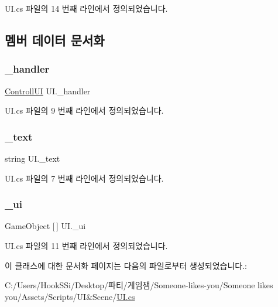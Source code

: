 U\+I.\+cs 파일의 14 번째 라인에서 정의되었습니다.


\begin{DoxyCode}{0}

\end{DoxyCode}


\subsection{멤버 데이터 문서화}
\mbox{\label{class_u_i_abd8fa36b26bb2f28b91ef983d965fa36}} 
\subsubsection{\texorpdfstring{\_handler}{\_handler}}
{\footnotesize\ttfamily \mbox{\hyperlink{class_u_i_aaf972ce6483c1efd427a579a33b42552}{Controll\+UI}} U\+I.\+\_\+handler}



U\+I.\+cs 파일의 9 번째 라인에서 정의되었습니다.

\mbox{\label{class_u_i_affa689bbe19b28237e02c9fcaac85585}} 
\subsubsection{\texorpdfstring{\_text}{\_text}}
{\footnotesize\ttfamily string U\+I.\+\_\+text}



U\+I.\+cs 파일의 7 번째 라인에서 정의되었습니다.

\mbox{\label{class_u_i_a96cc096c816feecc70b636fa26161d09}} 
\subsubsection{\texorpdfstring{\_ui}{\_ui}}
{\footnotesize\ttfamily Game\+Object \mbox{[}$\,$\mbox{]} U\+I.\+\_\+ui}



U\+I.\+cs 파일의 11 번째 라인에서 정의되었습니다.



이 클래스에 대한 문서화 페이지는 다음의 파일로부터 생성되었습니다.\+:\begin{DoxyCompactItemize}
\item 
C\+:/\+Users/\+Hook\+S\+Si/\+Desktop/파티/게임잼/\+Someone-\/likes-\/you/\+Someone likes you/\+Assets/\+Scripts/\+U\+I\&\+Scene/\mbox{\hyperlink{_u_i_8cs}{U\+I.\+cs}}\end{DoxyCompactItemize}
